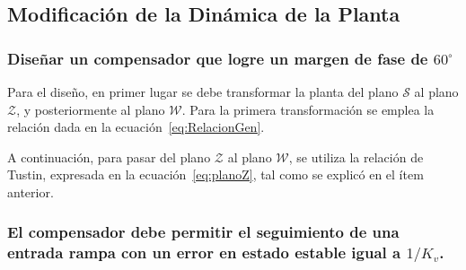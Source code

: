 \subsection{Modificación de la Dinámica de la Planta}
\subsubsection{Diseñar un compensador que logre un margen de fase de $60^\circ$} 

Para el diseño, en primer lugar se debe transformar la planta del plano $\mathcal{S}$ al plano $\mathcal{Z}$, y posteriormente al plano $\mathcal{W}$. Para la primera transformación se emplea la relación dada en la ecuación~\ref{eq:RelacionGen}.  

A continuación, para pasar del plano $\mathcal{Z}$ al plano $\mathcal{W}$, se utiliza la relación de Tustin, expresada en la ecuación~\ref{eq:planoZ}, tal como se explicó en el ítem anterior.


\subsubsection{El compensador debe permitir el seguimiento de una entrada rampa con un error en estado estable igual a $1/K_v$.}
